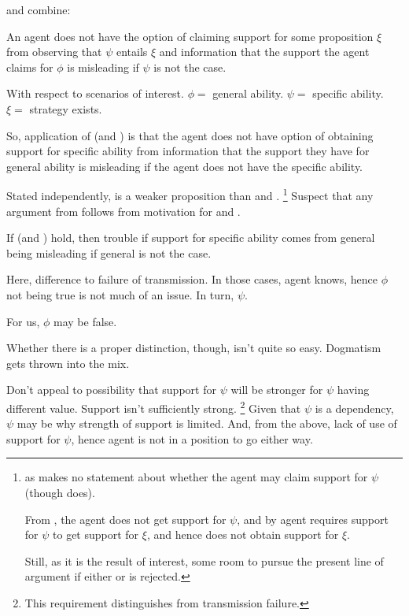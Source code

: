 \begin{note}[Combination]
  \nI{} and \nIm{} combine:

  \begin{proposition}[\nIp{}]
    An agent does not have the option of claiming support for some proposition \(\xi\) from observing that \(\psi\) entails \(\xi\) and information that the support the agent claims for \(\phi\) is misleading if \(\psi\) is not the case.
  \end{proposition}

  With respect to scenarios of interest.
    \(\phi = \) general ability.
    \(\psi = \) specific ability.
    \(\xi = \) strategy exists.

    So, application of \nI{} (and \nIm{}) is that the agent does not have option of obtaining support for specific ability from information that the support they have for general ability is misleading if the agent does not have the specific ability.

    Stated independently, \nIp{} is a weaker proposition than \nI{} and \nIm{}.\nolinebreak
    \footnote{
      as \nIp{} makes no statement about whether the agent may claim support for \(\psi\) (though \nI{} does).

      From \nI{}, the agent does not get support for \(\psi\), and by \nIm{} agent requires support for \(\psi\) to get support for \(\xi\), and hence does not obtain support for \(\xi\).

    Still, as it is the result of interest, some room to pursue the present line of argument if either \nI{} or \nIm{} is rejected.
    }
    Suspect that any argument from \nIp{} follows from motivation for \nI{} and \nIm{}.

  If \nI{} (and \nIm{}) hold, then trouble if support for specific ability comes from general being misleading if general is not the case.
\end{note}


\begin{note}
  Here, difference to failure of transmission.
  In those cases, agent knows, hence \(\phi\) not being true is not much of an issue.
  In turn, \(\psi\).

  For us, \(\phi\) may be false.

  Whether there is a proper distinction, though, isn't quite so easy.
  Dogmatism gets thrown into the mix.
\end{note}


\begin{note}
  Don't appeal to possibility that support for \(\psi\) will be stronger for \(\psi\) having different value.
  Support isn't sufficiently strong.\nolinebreak
  \footnote{
    This requirement distinguishes from transmission failure.
  }
  Given that \(\psi\) is a dependency, \(\psi\) may be why strength of support is limited.
  And, from the above, lack of use of support for \(\psi\), hence agent is not in a position to go either way.
\end{note}


